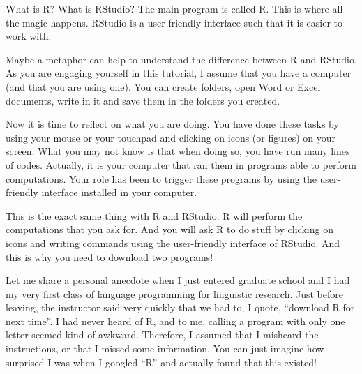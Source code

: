 \documentclass[
  ignorenonframetext,
]{beamer}
\begin{document}
\begin{frame}{What is R? What is RStudio?}
The main program is called R. This is where all the magic happens.
RStudio is a user-friendly interface such that it is easier to work
with.

Maybe a metaphor can help to understand the difference between R and
RStudio. As you are engaging yourself in this tutorial, I assume that
you have a computer (and that you are using one). You can create
folders, open Word or Excel documents, write in it and save them in the
folders you created.

\begin{tcolorbox}[enhanced jigsaw, colback=white, opacityback=0, bottomrule=.15mm, colframe=quarto-callout-tip-color-frame, rightrule=.15mm, left=2mm, colbacktitle=quarto-callout-tip-color!10!white, leftrule=.75mm, opacitybacktitle=0.6, bottomtitle=1mm, toprule=.15mm, coltitle=black, breakable, toptitle=1mm, titlerule=0mm, title=\textcolor{quarto-callout-tip-color}{\faLightbulb}\hspace{0.5em}{Think about it}, arc=.35mm]

Now it is time to reflect on what you are doing. You have done these
tasks by using your mouse or your touchpad and clicking on icons (or
figures) on your screen. What you may not know is that when doing so,
you have run many lines of codes. Actually, it is your computer that ran
them in programs able to perform computations. Your role has been to
trigger these programs by using the user-friendly interface installed in
your computer.

\end{tcolorbox}

This is the exact same thing with R and RStudio. R will perform the
computations that you ask for. And you will ask R to do stuff by
clicking on icons and writing commands using the user-friendly interface
of RStudio. And this is why you need to download two programs!

\begin{tcolorbox}[enhanced jigsaw, colback=white, opacityback=0, bottomrule=.15mm, colframe=quarto-callout-note-color-frame, rightrule=.15mm, left=2mm, colbacktitle=quarto-callout-note-color!10!white, leftrule=.75mm, opacitybacktitle=0.6, bottomtitle=1mm, toprule=.15mm, coltitle=black, breakable, toptitle=1mm, titlerule=0mm, title=\textcolor{quarto-callout-note-color}{\faInfo}\hspace{0.5em}{Anecdote}, arc=.35mm]

Let me share a personal anecdote when I just entered graduate school and
I had my very first class of language programming for linguistic
research. Just before leaving, the instructor said very quickly that we
had to, I quote, ``download R for next time''. I had never heard of R,
and to me, calling a program with only one letter seemed kind of
awkward. Therefore, I assumed that I misheard the instructions, or that
I missed some information. You can just imagine how surprised I was when
I googled ``R'' and actually found that this existed!

\end{tcolorbox}
\end{frame}
\end{document}
